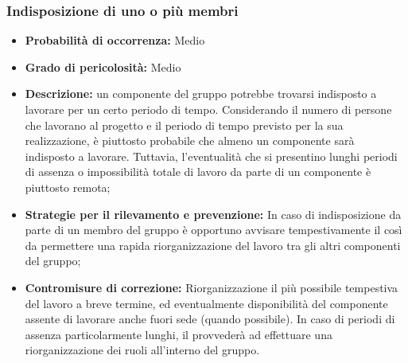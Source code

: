 \subsubsection{Indisposizione di uno o più membri}
\hypertarget{subsubsect:indisposizione}{}
\begin{itemize}
\item \textbf{Probabilità di occorrenza:} Medio
\item \textbf{Grado di pericolosità:} Medio
\item \textbf{Descrizione:} un componente del gruppo potrebbe trovarsi indisposto a lavorare per un certo periodo di tempo. Considerando il numero di persone che lavorano al progetto  e il periodo di tempo previsto per la sua realizzazione, è piuttosto probabile che almeno un componente sarà indisposto a lavorare. Tuttavia, l'eventualità che si presentino lunghi periodi di assenza o impossibilità totale di lavoro da parte di un componente è piuttosto remota;
\item \textbf{Strategie per il rilevamento e prevenzione:} In caso di indisposizione da parte di un membro del gruppo è opportuno avvisare tempestivamente il \ruoloResponsabile{}  così da permettere una rapida riorganizzazione del lavoro tra gli altri componenti del gruppo;
\item \textbf{Contromisure di correzione:} Riorganizzazione il più possibile tempestiva del lavoro a breve termine, ed eventualmente disponibilità del componente assente di lavorare anche fuori sede (quando possibile). In caso di periodi di assenza particolarmente lunghi, il \ruoloResponsabile{} provvederà ad effettuare una riorganizzazione dei ruoli all'interno del gruppo.
\end{itemize}

